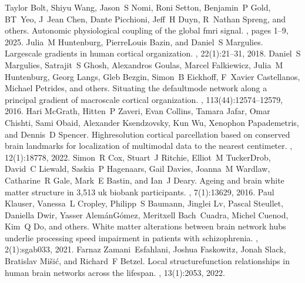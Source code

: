 \documentclass[letterpaper,10pt,english]{jupyterBook}
\begin{document}
\begin{sphinxthebibliography}{10}
\sphinxAtStartPar
Taylor Bolt, Shiyu Wang, Jason S Nomi, Roni Setton, Benjamin P Gold, BT Yeo, J Jean Chen, Dante Picchioni, Jeff H Duyn, R Nathan Spreng, and others. Autonomic physiological coupling of the global fmri signal. , pages 1–9, 2025.
\sphinxAtStartPar
Julia M Huntenburg, Pierre\sphinxhyphen{}Louis Bazin, and Daniel S Margulies. Large\sphinxhyphen{}scale gradients in human cortical organization. , 22(1):21–31, 2018.
\sphinxAtStartPar
Daniel S Margulies, Satrajit S Ghosh, Alexandros Goulas, Marcel Falkiewicz, Julia M Huntenburg, Georg Langs, Gleb Bezgin, Simon B Eickhoff, F Xavier Castellanos, Michael Petrides, and others. Situating the default\sphinxhyphen{}mode network along a principal gradient of macroscale cortical organization. , 113(44):12574–12579, 2016.
\sphinxAtStartPar
Hari McGrath, Hitten P Zaveri, Evan Collins, Tamara Jafar, Omar Chishti, Sami Obaid, Alexander Ksendzovsky, Kun Wu, Xenophon Papademetris, and Dennis D Spencer. High\sphinxhyphen{}resolution cortical parcellation based on conserved brain landmarks for localization of multimodal data to the nearest centimeter. , 12(1):18778, 2022.
\sphinxAtStartPar
Simon R Cox, Stuart J Ritchie, Elliot M Tucker\sphinxhyphen{}Drob, David C Liewald, Saskia P Hagenaars, Gail Davies, Joanna M Wardlaw, Catharine R Gale, Mark E Bastin, and Ian J Deary. Ageing and brain white matter structure in 3,513 uk biobank participants. , 7(1):13629, 2016.
\sphinxAtStartPar
Paul Klauser, Vanessa L Cropley, Philipp S Baumann, Jinglei Lv, Pascal Steullet, Daniella Dwir, Yasser Alemán\sphinxhyphen{}Gómez, Meritxell Bach Cuadra, Michel Cuenod, Kim Q Do, and others. White matter alterations between brain network hubs underlie processing speed impairment in patients with schizophrenia. , 2(1):sgab033, 2021.
\sphinxAtStartPar
Farnaz Zamani Esfahlani, Joshua Faskowitz, Jonah Slack, Bratislav Mišić, and Richard F Betzel. Local structure\sphinxhyphen{}function relationships in human brain networks across the lifespan. , 13(1):2053, 2022.

\end{sphinxthebibliography}
\end{document}
